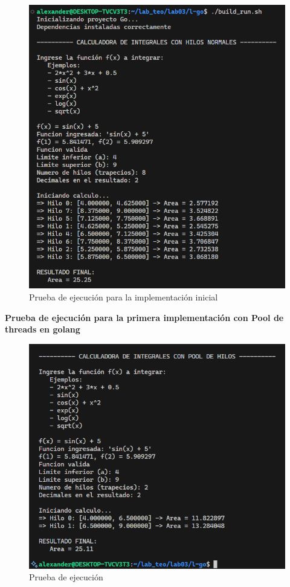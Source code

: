 \begin{figure}[H]
    \centering
    \includegraphics[width=0.8\linewidth]{img/go_prueba_hilo_1.PNG}
    \caption{Prueba de ejecución para la implementación inicial}
    \label{fig:placeholder}
\end{figure}

\textbf{Prueba de ejecución para la primera implementación con Pool de threads en golang}

\begin{figure}[H]
    \centering
    \includegraphics[width=0.8\linewidth]{img/go_prueba_pool_1.PNG}
    \caption{Prueba de ejecución}
    \label{fig:placeholder}
\end{figure}

